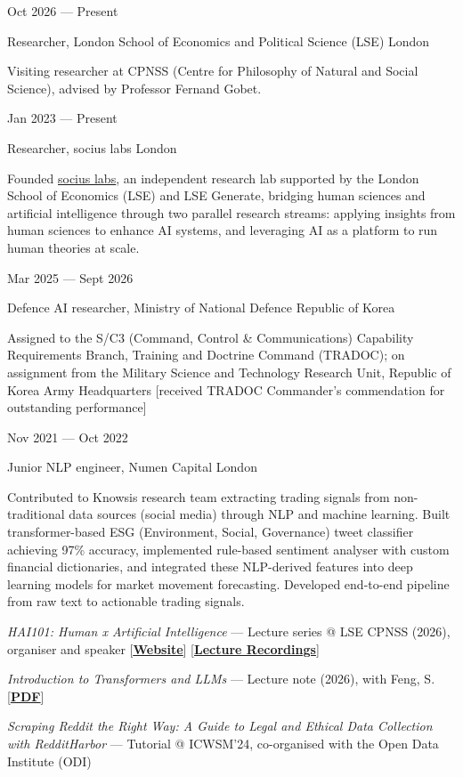 \documentclass[10pt]{article}
\newlength{\labelw}\setlength{\labelw}{123pt}
\newlength{\colgap}\setlength{\colgap}{3pt}
\newlength{\contentw}\setlength{\contentw}{381pt}
\newcommand{\bodysize}{\fontsize{9}{11.25}\selectfont}
\newcommand{\lblfont}{\fontsize{7.5}{9.5}\selectfont}
\newcommand{\titlefont}{\fontsize{11}{13.2}\selectfont}
\newcommand{\lbl}[1]{{\lblfont\textls[90]{#1}}}
\newcommand{\ilink}[2]{\href{#1}{\textcolor{linkblue}{\uline{#2}}}}  %
\newcommand{\plink}[2]{[\href{#1}{\textcolor{linkblue}{\uline{\textbf{#2}}}}]} %
\newcommand{\secrule}{\par\needspace{48pt}\vspace{11pt}\noindent{\color{textcol}\rule{\textwidth}{0.75pt}}\par\vspace{10pt}\nopagebreak}
\newcommand{\lblrow}[1]{\noindent\lbl{#1}\par\nopagebreak\vspace{8pt}}
\newcommand{\cvrow}[2]{\noindent\begin{minipage}[t]{\labelw}\raggedright\lbl{#1}\end{minipage}\hspace{\colgap}%
\begin{minipage}[t]{\contentw}#2\end{minipage}\par}
\newcommand{\daterow}[2]{\noindent\begin{minipage}[t]{\labelw}\raggedright #1\end{minipage}\hspace{\colgap}%
\begin{minipage}[t]{\contentw}#2\end{minipage}\par}
\newcommand{\controw}[1]{\vspace{10pt}\noindent\hspace{\labelw}\hspace{\colgap}%
\begin{minipage}[t]{\contentw}#1\end{minipage}\par}
\newcommand{\entry}[2]{{\titlefont #1}\nolinebreak[1]\hspace*{\fill} {\bodysize #2}}
\newcommand{\entrysep}{\vspace{10pt}}
\begin{document}
\secrule
\lblrow{PROFESSIONAL EXPERIENCE}
\daterow{Oct 2026 --- Present}{%
\entry{Researcher, London School of Economics and Political Science (LSE)}{London}\par\vspace{3pt}
Visiting researcher at CPNSS (Centre for Philosophy of Natural and Social Science), advised by Professor Fernand Gobet.}
\entrysep
\daterow{Jan 2023 --- Present}{%
\entry{Researcher, socius labs}{London}\par\vspace{3pt}
Founded \ilink{https://socius.org}{socius labs}, an independent research lab supported by the London School of Economics (LSE) and LSE Generate, bridging human sciences and artificial intelligence through two parallel research streams: applying insights from human sciences to enhance AI systems, and leveraging AI as a platform to run human theories at scale.}
\entrysep
\daterow{Mar 2025 --- Sept 2026}{%
\entry{Defence AI researcher, Ministry of National Defence}{Republic of Korea}\par\vspace{3pt}
Assigned to the S/C3 (Command, Control \& Communications) Capability Requirements Branch, Training and Doctrine Command (TRADOC); on assignment from the Military Science and Technology Research Unit, Republic of Korea Army Headquarters [received TRADOC Commander's commendation for outstanding performance]}
\entrysep
\daterow{Nov 2021 --- Oct 2022}{%
\entry{Junior NLP engineer, Numen Capital}{London}\par\vspace{3pt}
Contributed to Knowsis research team extracting trading signals from non-traditional data sources (social media) through NLP and machine learning. Built transformer-based ESG (Environment, Social, Governance) tweet classifier achieving 97\% accuracy, implemented rule-based sentiment analyser with custom financial dictionaries, and integrated these NLP-derived features into deep learning models for market movement forecasting. Developed end-to-end pipeline from raw text to actionable trading signals.}

\secrule
\cvrow{TEACHING \& TUTORIALS}{%
\textit{HAI101: Human x Artificial Intelligence} --- Lecture series @ LSE CPNSS (2026), organiser and speaker \plink{https://socialscience.ai}{Website} \plink{https://www.youtube.com/playlist?list=PLWM0TBrF7f4c}{Lecture Recordings}}
\controw{%
\textit{Introduction to Transformers and LLMs} --- Lecture note (2026), with Feng, S. \plink{https://nick-sh-oh.github.io/pdf/transformers_llms.pdf}{PDF}}
\controw{%
\textit{Scraping Reddit the Right Way: A Guide to Legal and Ethical Data Collection with RedditHarbor} --- Tutorial @ ICWSM'24, co-organised with the Open Data Institute (ODI)}
\end{document}
